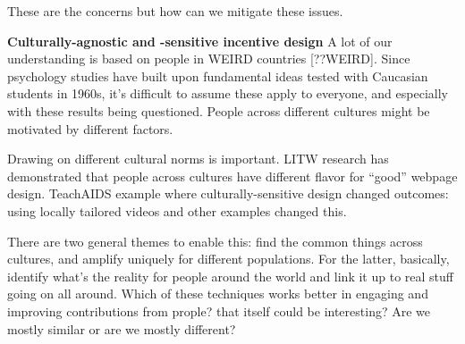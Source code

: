 These are the concerns but how can we mitigate these issues.


\textbf{Culturally-agnostic and -sensitive incentive design}
A lot of our understanding is based on people in WEIRD countries [??WEIRD]. Since psychology studies have built upon fundamental ideas tested with Caucasian students in 1960s, it’s difficult to assume these apply to everyone, and especially with these results being questioned. People across different cultures might be motivated by different factors. 

Drawing on different cultural norms is important. LITW research has demonstrated that people across cultures have different flavor for “good” webpage design. TeachAIDS example where culturally-sensitive design changed outcomes: using locally tailored videos and other examples changed this.

There are two general themes to enable this: find the common things across cultures, and amplify uniquely for different populations. For the latter, basically, identify what’s the reality for people around the world and link it up to real stuff going on all around. Which of these techniques works better in engaging and improving contributions from prople? that itself could be interesting? Are we mostly similar or are we mostly different?

